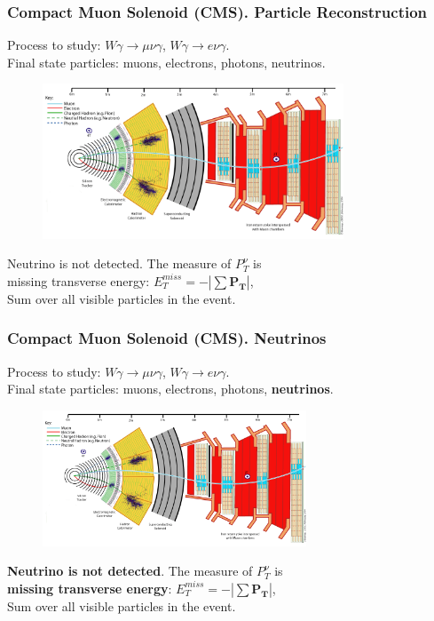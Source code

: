 \begin{frame}\frametitle{Compact Muon Solenoid (CMS). Particle Reconstruction}
\scriptsize
Process to study: $W\gamma\rightarrow\mu\nu\gamma$, $W\gamma\rightarrow e\nu\gamma$.\\
Final state particles: muons, electrons, photons, neutrinos.\\
\begin{figure}[htb]
  \begin{center}
    {\includegraphics[width=0.80\textwidth]{../figs/Exp/CMS_Slice.png}}
  \end{center}
\end{figure}

\scriptsize
Neutrino is not detected. The measure of $P_T^{\nu}$ is\\ 
missing transverse energy: $  E_T^{miss} = - | \sum \mathbf{P_T} |$,\\
Sum over all visible particles in the event. 

\end{frame}%

\begin{frame}\frametitle{Compact Muon Solenoid (CMS). Neutrinos}
\scriptsize
Process to study: $W\gamma\rightarrow\mu\nu\gamma$, $W\gamma\rightarrow e\nu\gamma$.\\
Final state particles: muons, electrons, photons, {\color{blue}\bfseries{neutrinos}}.\\
\begin{figure}[htb]
  \begin{center}
    {\includegraphics[width=0.70\textwidth]{../figs/Exp/CMS_Slice.png}}
  \end{center}
\end{figure}

\scriptsize
{\color{blue}\bfseries{Neutrino is not detected}}. The measure of $P_T^{\nu}$ is\\ 
{\bfseries{missing transverse energy}}: $  E_T^{miss} = - | \sum \mathbf{P_T} |$,\\
Sum over all visible particles in the event. 

\end{frame}%

